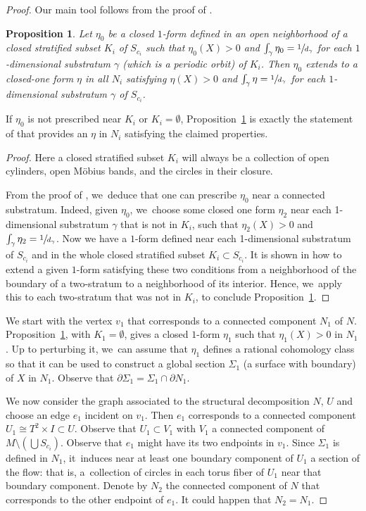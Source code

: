 \documentclass[JEP,XML,SOM,Unicode,NoEqCountersInSection,NoFloatCountersInSection,published]{cedram}
\newtheorem{prop}[theorem]{Proposition}
\theoremstyle{definition}
\begin{document}
\begin{proof}
Our main tool follows from the proof of \cite[Prop.\,2.8]{CV2}.

\begin{prop}\label{prop:CV2}
Let $\eta_0$ be a closed $1$-form defined in an open neighborhood of a closed stratified subset $K_i$ of $S_{c_i}$ such that $\eta_0(X)>0$ and $\int_{\gamma}\eta_0=\sfrac{1}{d_{\gamma}}$ for each $1$-dimensional substratum $\gamma$ (which is a periodic orbit) of $K_i$. Then $\eta_0$ extends to a closed-one form $\eta$ in all $N_i$ satisfying $\eta(X)>0$ and $\int_{\gamma} \eta=\sfrac{1}{d_{\gamma}}$ for each $1$-dimensional substratum $\gamma$ of $S_{c_i}$.
\end{prop}

If $\eta_0$ is not prescribed near $K_i$ or $K_i=\emptyset$, Proposition~\ref{prop:CV2} is exactly the statement of \cite[Prop.\,2.8]{CV2} that provides an $\eta$ in $N_i$ satisfying the claimed properties.

\begin{proof}
Here a closed stratified subset $K_i$ will always be a collection of open cylinders, open Möbius bands, and the circles in their closure.\enlargethispage{.5\baselineskip}%

From the proof of \cite[Prop.\,2.8]{CV2}, we~deduce that one can prescribe $\eta_0$ near a connected substratum. Indeed, given $\eta_0$, we~choose some closed one form $\eta_2$ near each 1-dimensional substratum $\gamma$ that is not in $K_i$, such that $\eta_2(X)>0$ and $\int_{\gamma}\eta_2=\sfrac{1}{d_{\gamma}}$. Now we have a $1$-form defined near each 1-dimensional substratum of $S_{c_i}$ and in the whole closed stratified subset $K_i\subset S_{c_i}$. It is shown in \cite[\S 2, p.\,463--464]{CV2} how to extend a given $1$-form satisfying these two conditions from a neighborhood of the boundary of a two-stratum to a neighborhood of its interior. Hence, we~apply this to each two-stratum that was not in $K_i$, to conclude Proposition~\ref{prop:CV2}.
\end{proof}

We start with the vertex $v_1$ that corresponds to a connected component $N_1$ of $N$. Proposition~\ref{prop:CV2}, with $K_1=\emptyset$, gives a closed $1$-form $\eta_1$ such that $\eta_1(X)>0$ in $N_1$. Up to perturbing it, we~can assume that $\eta_1$ defines a rational cohomology class so that it can be used to construct a global section $\Sigma_1$ (a surface with boundary) of $X$ in $N_1$. Observe that $\partial\Sigma_1=\Sigma_1\cap \partial N_1$.

We now consider the graph associated to the structural decomposition $N$, $U$ and choose an edge $e_1$ incident on $v_1$. Then $e_1$ corresponds to a connected component $U_1\cong T^2\times I\subset U$. Observe that $U_1\subset V_1$ with $V_1$ a connected component of $M\setminus \left( \bigcup S_{c_i} \right)$. Observe that $e_1$ might have its two endpoints in $v_1$. Since $\Sigma_1$ is defined in $N_1$, it~induces near at least one boundary component of $U_1$ a section of the flow: that is, a~collection of circles in each torus fiber of $U_1$ near that boundary component. Denote by $N_2$ the connected component of $N$ that corresponds to the other endpoint of $e_1$. It could happen that $N_2=N_1$.


\end{proof}
\end{document}
